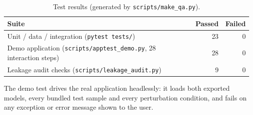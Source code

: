 \begin{table}[h]
\centering
\caption{Test results (generated by \texttt{scripts/make\_qa.py}).}
\label{tab:testresults}
\begin{tabular}{lrr}
\toprule
Suite & Passed & Failed \\
\midrule
Unit / data / integration (\texttt{pytest tests/}) & 23 & 0 \\
Demo application (\texttt{scripts/apptest\_demo.py}, 28 interaction steps) & 28 & 0 \\
Leakage audit checks (\texttt{scripts/leakage\_audit.py}) & 9 & 0 \\
\bottomrule
\end{tabular}
\end{table}
The demo test drives the real application headlessly: it loads both exported models, every bundled test sample and every perturbation condition, and fails on any exception or error message shown to the user.